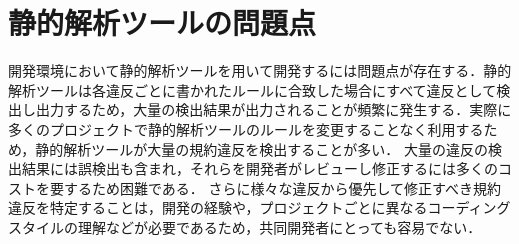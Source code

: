 \documentclass[11pt,dvipdfmx]{jreport}
\begin{document}

\section{静的解析ツールの問題点}

開発環境において静的解析ツールを用いて開発するには問題点が存在する．静的解析ツールは各違反ごとに書かれたルールに合致した場合にすべて違反として検出し出力するため，大量の検出結果が出力されることが頻繁に発生する．実際に多くのプロジェクトで静的解析ツールのルールを変更することなく利用するため，静的解析ツールが大量の規約違反を検出することが多い\cite{UsingStaticAnalysisTools2}．
大量の違反の検出結果には誤検出も含まれ，それらを開発者がレビューし修正するには多くのコストを要するため困難である．
さらに様々な違反から優先して修正すべき規約違反を特定することは，開発の経験や，プロジェクトごとに異なるコーディングスタイルの理解などが必要であるため，共同開発者にとっても容易でない\cite{shuseisarenai}．


\end{document}
